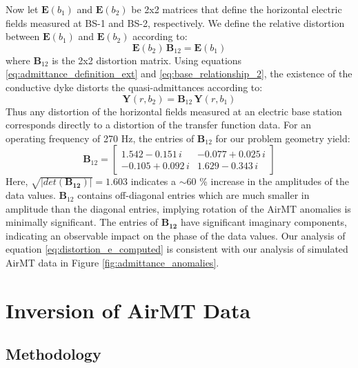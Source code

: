 \documentclass{segabs}
\begin{document}
Now let $\mathbf{E}(b_1)$ and $\mathbf{E}(b_2)$ be 2x2 matrices that define the horizontal electric fields measured at BS-1 and BS-2, respectively. We define the relative distortion between $\mathbf{E}(b_1)$ and $\mathbf{E}(b_2)$ according to:
\begin{equation}
\label{eq:base_relationship_2}
\mathbf{E}(b_2) \, \mathbf{B}_{12} = \mathbf{E}(b_1)
\end{equation}
where $\mathbf{B}_{12}$ is the 2x2 distortion matrix. Using equations \ref{eq:admittance_definition_ext} and \ref{eq:base_relationship_2}, the existence of the conductive dyke distorts the quasi-admittances according to:
\begin{equation}
\mathbf{Y}(r, b_2) = \mathbf{B}_{12} \, \mathbf{Y}(r, b_1)
\end{equation}
Thus any distortion of the horizontal fields measured at an electric base station corresponds directly to a distortion of the transfer function data. For an operating frequency of 270 Hz, the entries of $\mathbf{B}_{12}$ for our problem geometry yield:
\begin{equation}
\label{eq:distortion_e_computed}
\mathbf{B}_{12} = \begin{bmatrix}
1.542 - 0.151 \, i & -0.077 + 0.025 \, i \\
-0.105 + 0.092 \, i & 1.629 - 0.343 \, i
\end{bmatrix}
\end{equation}
Here, $\sqrt{|det(\mathbf{B_{12}})|} = 1.603$ indicates a $\sim$60 \% increase in the amplitudes of the data values. $\mathbf{B}_{12}$ contains off-diagonal entries which are much smaller in amplitude than the diagonal entries, implying rotation of the AirMT anomalies is minimally significant. The entries of $\mathbf{B_{12}}$ have significant imaginary components, indicating an observable impact on the phase of the data values. Our analysis of equation \ref{eq:distortion_e_computed} is consistent with our analysis of simulated AirMT data in Figure \ref{fig:admittance_anomalies}.

\vspace{-15pt}
\section{Inversion of AirMT Data}
\vspace{-5pt}
\subsection{Methodology}
\end{document}
